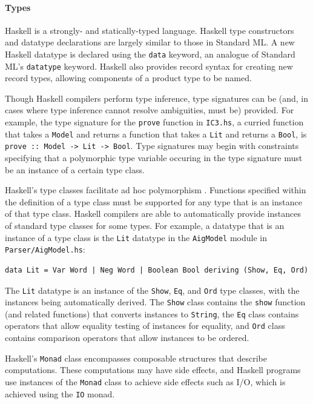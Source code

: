 \documentclass[12pt,a4paper,twoside,openright]{report}
\begin{document}
\paragraph{Types}{
Haskell is a strongly- and statically-typed language.
Haskell type constructors and datatype declarations are largely similar to those in
Standard ML. A new Haskell datatype is declared using the \verb,data, keyword, an analogue
of Standard ML's \verb,datatype, keyword.
Haskell also provides record syntax for creating new record types, allowing components
of a product type to be named.

Though Haskell compilers perform type inference, type
signatures can be (and, in cases where type inference cannot resolve
ambiguities, must be) provided. For example, the type signature for
the \verb,prove, function in \verb,IC3.hs,, a curried function that takes
a \verb,Model, and returns a function that takes a \verb,Lit, and returns a \verb,Bool,,
is \verb,prove :: Model -> Lit -> Bool,. Type signatures may begin with
constraints specifying that a polymorphic type variable occuring in the type
signature must be an instance of a certain type class.


Haskell's type classes facilitate ad hoc polymorphism \cite{hall94}.
Functions specified within the definition of a type class
must be supported for any type that is an instance of that type class.
Haskell compilers are able to automatically provide instances of standard
type classes for some types.
For example, a datatype that is an instance of a type class is the \verb,Lit, datatype
in the \verb,AigModel, module in \verb,Parser/AigModel.hs,:
\begin{lstlisting}
data Lit = Var Word | Neg Word | Boolean Bool deriving (Show, Eq, Ord)
\end{lstlisting}
The \verb,Lit, datatype is an instance of the \verb,Show,, \verb,Eq,, and
\verb,Ord, type classes, with the instances being automatically derived.
The \verb,Show, class contains the \verb,show, function (and related functions) that
converts instances to \verb,String,, the \verb,Eq, class contains
operators that allow equality testing of instances for
equality, and \verb,Ord, class contains comparison operators
that allow instances to be ordered.

Haskell's \verb,Monad, class encompasses composable
structures that describe computations. These computations
may have side effects, and Haskell programs use instances of the
\verb,Monad, class to achieve side effects such as I/O, which is
achieved using the \verb,IO, monad.

}
\end{document}
